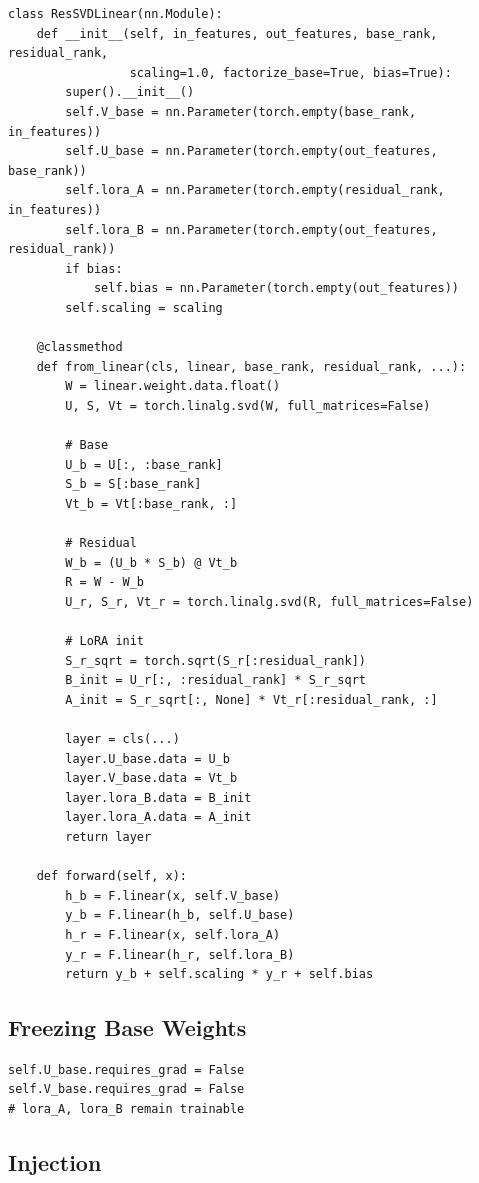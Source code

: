 \begin{lstlisting}
class ResSVDLinear(nn.Module):
    def __init__(self, in_features, out_features, base_rank, residual_rank,
                 scaling=1.0, factorize_base=True, bias=True):
        super().__init__()
        self.V_base = nn.Parameter(torch.empty(base_rank, in_features))
        self.U_base = nn.Parameter(torch.empty(out_features, base_rank))
        self.lora_A = nn.Parameter(torch.empty(residual_rank, in_features))
        self.lora_B = nn.Parameter(torch.empty(out_features, residual_rank))
        if bias:
            self.bias = nn.Parameter(torch.empty(out_features))
        self.scaling = scaling
    
    @classmethod
    def from_linear(cls, linear, base_rank, residual_rank, ...):
        W = linear.weight.data.float()
        U, S, Vt = torch.linalg.svd(W, full_matrices=False)
        
        # Base
        U_b = U[:, :base_rank]
        S_b = S[:base_rank]
        Vt_b = Vt[:base_rank, :]
        
        # Residual
        W_b = (U_b * S_b) @ Vt_b
        R = W - W_b
        U_r, S_r, Vt_r = torch.linalg.svd(R, full_matrices=False)
        
        # LoRA init
        S_r_sqrt = torch.sqrt(S_r[:residual_rank])
        B_init = U_r[:, :residual_rank] * S_r_sqrt
        A_init = S_r_sqrt[:, None] * Vt_r[:residual_rank, :]
        
        layer = cls(...)
        layer.U_base.data = U_b
        layer.V_base.data = Vt_b
        layer.lora_B.data = B_init
        layer.lora_A.data = A_init
        return layer
    
    def forward(self, x):
        h_b = F.linear(x, self.V_base)
        y_b = F.linear(h_b, self.U_base)
        h_r = F.linear(x, self.lora_A)
        y_r = F.linear(h_r, self.lora_B)
        return y_b + self.scaling * y_r + self.bias
\end{lstlisting}

\subsection{Freezing Base Weights}

\begin{lstlisting}
self.U_base.requires_grad = False
self.V_base.requires_grad = False
# lora_A, lora_B remain trainable
\end{lstlisting}

\subsection{Injection}

